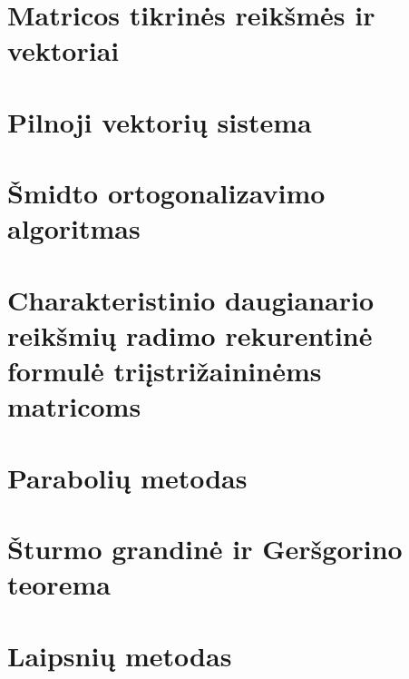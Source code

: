 \section{Matricos tikrinės reikšmės ir vektoriai}
\section{Pilnoji vektorių sistema}
\cite[134]{textbook}
\section{Šmidto ortogonalizavimo algoritmas}
\cite[201]{textbook}
\section{Charakteristinio daugianario reikšmių radimo rekurentinė
formulė triįstrižaininėms matricoms}
\cite[135]{textbook}
\section{Parabolių metodas}
\cite[136-137]{textbook}
\section{Šturmo grandinė ir Geršgorino teorema}
\cite[144]{textbook}
\section{Laipsnių metodas}
\cite[151-154]{textbook}
